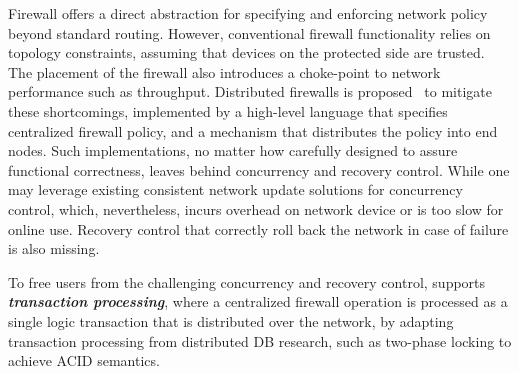  Firewall offers a direct
abstraction for specifying and enforcing network policy beyond
standard routing. However, conventional firewall functionality relies
on topology constraints, \eg assuming that devices on the protected
side are trusted.  The placement of the firewall also introduces a
choke-point to network performance such as throughput.  Distributed
firewalls is
proposed~\cite{impl-distributed-firewall,distributed-firewall} to
mitigate these shortcomings, implemented by a high-level language that
specifies centralized firewall policy, and a mechanism that
distributes the policy into end nodes.  Such implementations, no
matter how carefully designed to assure functional correctness, leaves
behind concurrency and recovery control. While one may leverage
existing consistent network update solutions for concurrency control,
which, nevertheless, incurs overhead on network device or is too slow
for online use.  Recovery control that correctly roll back the network
in case of failure is also missing.

To free users from the challenging concurrency and recovery control,
\Sys supports \textit{\textbf{transaction processing}}, where a
centralized firewall operation is processed as a single logic
transaction that is distributed over the network, by adapting
transaction processing from distributed DB research, such as two-phase
locking to achieve ACID semantics.



